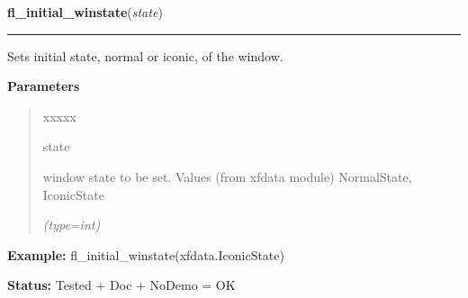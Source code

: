 \hspace{.8\funcindent}\begin{boxedminipage}{\funcwidth}

    \raggedright \textbf{fl\_initial\_winstate}(\textit{state})

    \vspace{-1.5ex}

    \rule{\textwidth}{0.5\fboxrule}
\setlength{\parskip}{2ex}
    Sets initial state, normal or iconic, of the window.

\setlength{\parskip}{1ex}
      \textbf{Parameters}
      \vspace{-1ex}

      \begin{quote}
        \begin{Ventry}{xxxxx}

          \item[state]

          window state to be set. Values (from xfdata module) NormalState, 
          IconicState

            {\it (type=int)}

        \end{Ventry}

      \end{quote}

\textbf{Example:} fl\_initial\_winstate(xfdata.IconicState)



\textbf{Status:} Tested + Doc + NoDemo = OK



    \end{boxedminipage}

    \label{xformslib:flxbasic:fl_create_colormap}

    \vspace{0.5ex}

